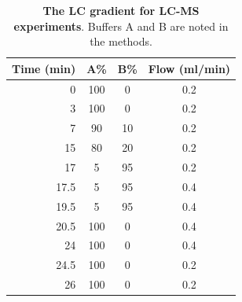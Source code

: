 \documentclass[twoside, watermark]{zHenriquesLab-StyleBioRxiv}
\begin{document}
\vspace{10mm}
\begin{table}[ht!]
    \centering
    \renewcommand{\arraystretch}{1.3}
    \captionsetup{width = 0.35\textwidth}
    \caption{\textbf{The LC gradient for LC-MS experiments}. Buffers A and B are noted in the methods.}
    \begin{tabular}{|r|c|c|c|}
        \hline
        Time (min) & A\% & B\% & Flow (ml/min) \\
        \hline
        0 & 100 & 0 & 0.2 \\
        \hline
        3 & 100 & 0 & 0.2 \\
        \hline
        7 & 90 & 10 & 0.2 \\
        \hline
        15 & 80 & 20 & 0.2 \\
        \hline
        17 & 5 & 95 & 0.2 \\
        \hline
        17.5 & 5 & 95 & 0.4 \\
        \hline
        19.5 & 5 & 95 & 0.4 \\
        \hline
        20.5 & 100 & 0 & 0.4 \\
        \hline
        24 & 100 & 0 & 0.4 \\
        \hline
        24.5 & 100 & 0 & 0.2 \\
        \hline
        26 & 100 & 0 & 0.2 \\
        \hline
    \end{tabular}
    \label{tab: tabS3}
\end{table}

\end{document}
